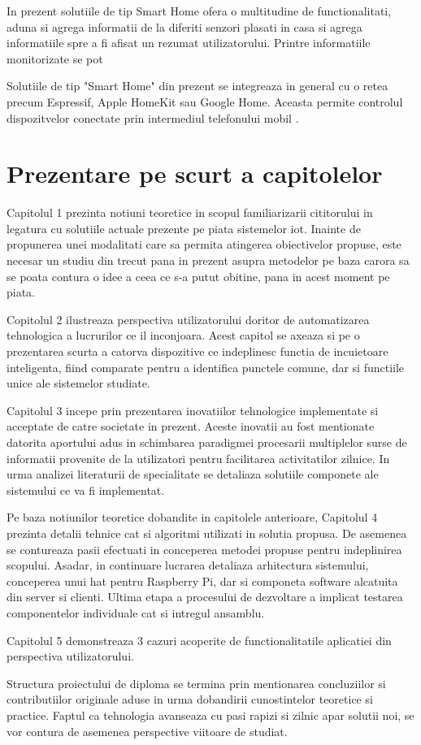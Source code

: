 In prezent solutiile de tip Smart Home ofera o multitudine de functionalitati, aduna si agrega informatii de la diferiti senzori plasati in casa si agrega informatiile spre a fi afisat un rezumat utilizatorului. Printre informatiile monitorizate se pot 

Solutiile de tip "Smart Home" din prezent se integreaza in general cu o retea precum Espressif, Apple HomeKit sau Google Home. Aceasta permite controlul dispozitvelor conectate prin intermediul telefonului mobil \cite{RISTESKASTOJKOSKA20171454}.


\section {Prezentare pe scurt a capitolelor}

Capitolul 1 prezinta notiuni teoretice in scopul familiarizarii cititorului in legatura cu solutiile actuale prezente pe piata sistemelor \acrshort{iot}. Inainte de propunerea unei modalitati care sa permita atingerea obiectivelor propuse, este necesar un studiu din trecut pana in prezent asupra metodelor pe baza carora sa se poata contura o idee a ceea ce s-a putut obitine, pana in acest moment pe piata.

Copitolul 2 ilustreaza perspectiva utilizatorului doritor de automatizarea tehnologica a lucrurilor ce il inconjoara. Acest capitol se axeaza si pe o prezentarea scurta a catorva dispozitive ce indeplinesc functia de incuietoare inteligenta, fiind comparate pentru a identifica punctele comune, dar si functiile unice ale sistemelor studiate.

Capitolul 3 incepe prin prezentarea inovatiilor tehnologice implementate si acceptate de catre societate in prezent. Aceste inovatii au fost mentionate datorita aportului adus in schimbarea paradigmei procesarii multiplelor surse de informatii provenite de la utilizatori pentru facilitarea activitatilor zilnice. In urma analizei literaturii de specialitate se detaliaza solutiile componete ale sistemului ce va fi implementat.

Pe baza notiunilor teoretice dobandite in capitolele anterioare, Capitolul 4 prezinta detalii tehnice cat si algoritmi utilizati in solutia propusa. De asemenea se contureaza pasii efectuati in conceperea metodei propuse pentru indeplinirea scopului. Asadar, in continuare lucrarea detaliaza arhitectura sistemului, conceperea unui \acrshort{hat} pentru Raspberry Pi, dar si componeta software alcatuita din server si clienti. Ultima etapa a procesului de dezvoltare a implicat testarea componentelor individuale cat si intregul ansamblu.

Capitolul 5 demonstreaza 3 cazuri acoperite de functionalitatile aplicatiei din perspectiva utilizatorului.

Structura proiectului de diploma se termina prin mentionarea concluziilor si contributiilor originale aduse in urma dobandirii cunostintelor teoretice si practice. Faptul ca tehnologia avanseaza cu pasi rapizi si zilnic apar solutii noi, se vor contura de asemenea perspective viitoare de studiat.